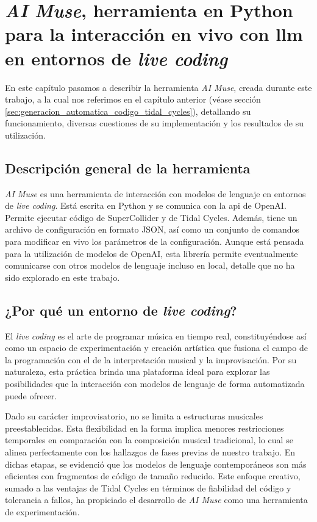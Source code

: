 \chapter{\emph{AI Muse}, herramienta en {Python} para la interacción en vivo con \gls{llm} en entornos de \emph{live coding}}
\label{chap:ai_muse}


En este capítulo pasamos a describir la herramienta \emph{AI Muse}, creada durante este trabajo, a la cual nos referimos en el capítulo anterior (véase sección \ref{sec:generacion_automatica_codigo_tidal_cycles}), detallando su funcionamiento, diversas cuestiones de su implementación y los resultados de su utilización.

\section{Descripción general de la herramienta}

\emph{AI Muse} es una herramienta de interacción con modelos de lenguaje en entornos de \emph{live coding}. Está escrita en Python y se comunica con la \gls{api} de OpenAI. Permite ejecutar código de SuperCollider y de Tidal Cycles. Además, tiene un archivo de configuración en formato JSON, así como un conjunto de comandos para modificar en vivo los parámetros de la configuración. Aunque está pensada para la utilización de modelos de OpenAI, esta librería permite eventualmente comunicarse con otros modelos de lenguaje incluso en local, detalle que no ha sido explorado en este trabajo.

\section{¿Por qué un entorno de \emph{live coding}?}

El \emph{live coding} es el arte de programar música en tiempo real, constituyéndose así como un espacio de experimentación y creación artística que fusiona el campo de la programación con el de la interpretación musical y la improvisación. Por su naturaleza, esta práctica brinda una plataforma ideal para explorar las posibilidades que la interacción con modelos de lenguaje de forma automatizada puede ofrecer.

Dado su carácter improvisatorio, no se limita a estructuras musicales preestablecidas. Esta flexibilidad en la forma implica menores restricciones temporales en comparación con la composición musical tradicional, lo cual se alinea perfectamente con los hallazgos de fases previas de nuestro trabajo. En dichas etapas, se evidenció que los modelos de lenguaje contemporáneos son más eficientes con fragmentos de código de tamaño reducido. Este enfoque creativo, sumado a las ventajas de Tidal Cycles en términos de fiabilidad del código y tolerancia a fallos, ha propiciado el desarrollo de \emph{AI Muse} como una herramienta de experimentación.


